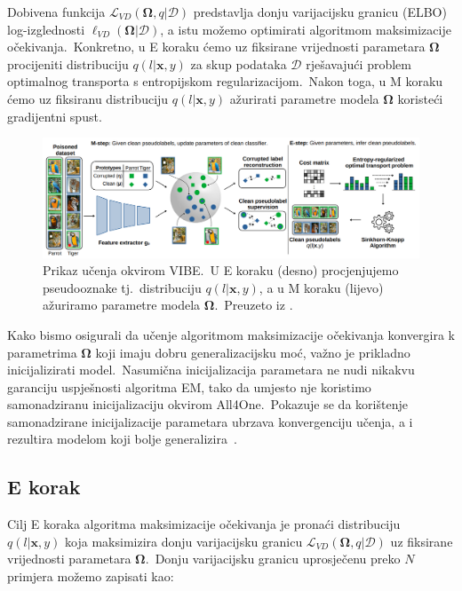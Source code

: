 \documentclass[diplomskirad]{fer}
\begin{document}
Dobivena funkcija $\mathcal{L}_{VD}(\bm{\Omega}, q | \mathcal{D})$ predstavlja donju varijacijsku granicu (ELBO) log-izglednosti $\ell_{VD}(\bm{\Omega}|\mathcal{D})$, a istu možemo optimirati algoritmom maksimizacije očekivanja.\ 
Konkretno, u E koraku ćemo uz fiksirane vrijednosti parametara $\bm{\Omega}$ procijeniti distribuciju $q(l | \bm{x}, y)$ za skup podataka $\mathcal{D}$ rješavajući problem optimalnog transporta s entropijskom regularizacijom.\ 
Nakon toga, u M koraku ćemo uz fiksiranu distribuciju $q(l | \bm{x}, y)$ ažurirati parametre modela $\bm{\Omega}$ koristeći gradijentni spust.\ 

\begin{figure}[h]
  \centering
  \includegraphics[scale=0.6]{./Slike/vibe.png}
  \caption{Prikaz učenja okvirom VIBE.\ U E koraku (desno) procjenjujemo pseudooznake tj.\ distribuciju $q(l | \bm{x}, y)$, a u M koraku (lijevo) ažuriramo parametre modela $\bm{\Omega}$.\ Preuzeto iz \cite{sabolic2025seal}.}
  \label{fig:vibe}
\end{figure}

Kako bismo osigurali da učenje algoritmom maksimizacije očekivanja konvergira k parametrima $\bm{\Omega}$ koji imaju dobru generalizacijsku moć, važno je prikladno inicijalizirati model.\ 
Nasumična inicijalizacija parametara ne nudi nikakvu garanciju uspješnosti algoritma EM, tako da umjesto nje koristimo samonadziranu inicijalizaciju okvirom All4One.\ 
Pokazuje se da korištenje samonadzirane inicijalizacije parametara ubrzava konvergenciju učenja, a i rezultira modelom koji bolje generalizira~\cite{sabolic2025seal}.\

\subsection{E korak}
\label{sub:e_step}

Cilj E koraka algoritma maksimizacije očekivanja je pronaći distribuciju $q(l | \bm{x}, y)$ koja maksimizira donju varijacijsku granicu $\mathcal{L}_{VD}(\bm{\Omega}, q | \mathcal{D})$ uz fiksirane vrijednosti parametara $\bm{\Omega}$.\ 
Donju varijacijsku granicu uprosječenu preko $N$ primjera možemo zapisati kao:
\end{document}
